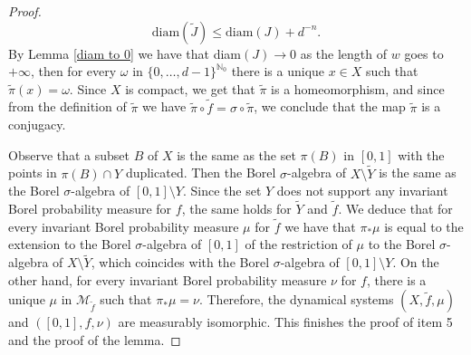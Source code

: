\documentclass[12pt]{amsart}
\numberwithin{equation}{section} %
\numberwithin{figure}{section} %
\theoremstyle{plain}
\theoremstyle{definition}
\theoremstyle{remark}
\theoremstyle{citing}
\newcommand{\N}{\mathbb{N}}
\renewcommand{\=}{\coloneqq}
\begin{document}
\begin{proof}
    \begin{equation}
        \text{diam}(\widetilde{J})\leq \text{diam}(J) + d^{-n}.
    \end{equation}
    By Lemma \ref{diam to 0} we have that diam$(J) \to 0$ as the length of $w$ goes to $+\infty$, then for every $\omega$ in $\{0,\ldots,d-1\}^{\N_0}$ there is a unique $x\in X$ such that $\widetilde{\pi}(x) = \omega$. Since $X$ is compact, we get that $\widetilde{\pi}$ is a homeomorphism, and since from the definition of $\widetilde{\pi}$ we have $\widetilde{\pi}\circ \widetilde{f}= \sigma\circ \widetilde{\pi}$, we conclude that the map $\widetilde{\pi}$ is a conjugacy.

    Observe that a subset $B$ of $X$ is the same as the set $\pi(B)$ in $[0,1]$ with the points in $\pi(B)\cap Y$ duplicated. Then the Borel $\sigma$-algebra of $X\setminus \widetilde{Y}$ is the same as the Borel $\sigma$-algebra of $[0,1]\setminus Y$. Since the set $Y$ does not support any invariant Borel probability measure for $f$, the same holds for $\widetilde{Y}$ and $\widetilde{f}.$ We deduce that for every invariant Borel probability measure $\mu$ for $\widetilde{f}$ we have that $\pi_*\mu$ is equal to the extension to the Borel $\sigma$-algebra of $[0,1]$ of the restriction of $\mu$ to the Borel $\sigma$-algebra of $X\setminus \widetilde{Y}$, which coincides with the Borel $\sigma$-algebra of $[0,1]\setminus Y$. On the other hand, for every invariant Borel probability measure $\nu$ for $f$, there is a unique $\mu$ in $\mathcal{M}_{\widetilde{f}}$ such that $\pi_*\mu = \nu$. Therefore, the dynamical systems $(X,\widetilde{f},\mu)$ and $([0,1],f,\nu)$ are measurably isomorphic. This finishes the proof of item 5 and the proof of the lemma.
\end{proof}
\end{document}
